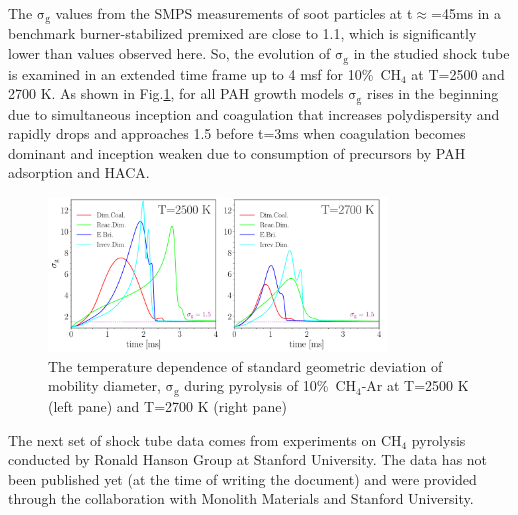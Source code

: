 The $\mathrm{\sigma_{g}}$ values from the SMPS measurements of soot particles at t$\approx$=45ms in a benchmark burner-stabilized premixed are close to 1.1, which is significantly lower than values observed here. So, the evolution of $\mathrm{\sigma_{g}}$ in the studied shock tube is examined in an extended time frame up to 4 msf for 10\%~$\mathrm{CH_4}$ at T=2500 and 2700 K. As shown in Fig.\ref{fig:shocktubesigmatime}, for all PAH growth models $\mathrm{\sigma_{g}}$ rises in the beginning due to simultaneous inception and coagulation that increases polydispersity and rapidly drops and approaches 1.5 before t=3ms when coagulation becomes dominant and inception weaken due to consumption of precursors by PAH adsorption and HACA.


\begin{figure}[H]
	\centering
	\includegraphics[width=0.8\textwidth]{Figures/Results/Shocktube/Agafonov2016/10CH4/sigma_time.pdf}
	\caption{The temperature dependence of standard geometric deviation of mobility diameter, $\mathrm{\sigma_{g}}$ during pyrolysis of 10\%~$\mathrm{CH_4}$-Ar at T=2500 K (left pane) and T=2700 K (right pane)}
	\label{fig:shocktubesigmatime} 
\end{figure}

%
%

The next set of shock tube data comes from experiments on $\mathrm{CH_4}$ pyrolysis conducted by Ronald Hanson Group at Stanford University. The data has not been published yet (at the time of writing the document) and were provided through the collaboration with Monolith Materials and Stanford University.

